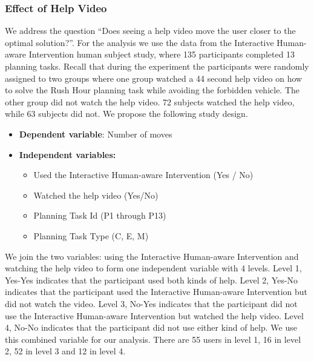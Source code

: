 \subsubsection{Effect of Help Video}
We address the question ``Does seeing a help video move the user closer to the optimal solution?''.
For the analysis we use the data from the Interactive Human-aware Intervention  human subject study, where 135 participants completed 13 planning tasks.
Recall that during the experiment the participants were randomly assigned to two groups where one group watched a 44 second help video on how to solve the Rush Hour planning task while avoiding the forbidden vehicle.
The other group did not watch the help video.
72 subjects watched the help video, while 63 subjects did not.
We propose the following study design.
\begin{itemize}
\item \textbf{Dependent variable}: Number of moves
\item \textbf{Independent variables:}
\begin{itemize}
\item Used the Interactive Human-aware Intervention (Yes / No)
\item Watched the help video (Yes/No)
\item Planning Task Id (P1 through P13)
\item Planning Task Type (C, E, M)
\end{itemize}
\end{itemize}
We join the two variables: using the Interactive Human-aware Intervention and watching the help video to form one independent variable with 4 levels.
Level 1, Yes-Yes indicates that the participant used both kinds of help.
Level 2, Yes-No indicates that the participant used the Interactive Human-aware Intervention but did not watch the video.
Level 3, No-Yes indicates that the participant did not use the Interactive Human-aware Intervention but watched the help video.
Level 4, No-No indicates that the participant did not use either kind of help.
We use this combined variable for our analysis.
There are 55 users in level 1, 16 in level 2, 52 in level 3 and 12 in level 4.

